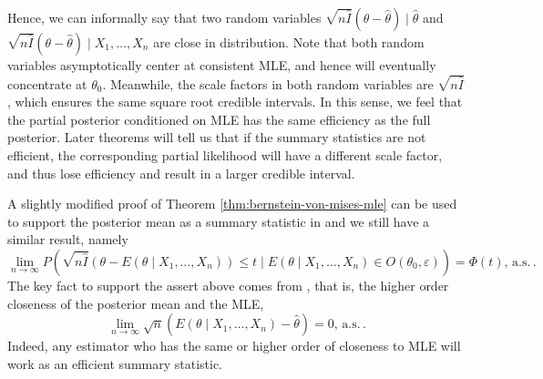 \documentclass[oneside,english]{amsbook}
\numberwithin{section}{chapter}
\numberwithin{equation}{section}
\numberwithin{figure}{section}
\theoremstyle{plain}
\theoremstyle{plain}
\theoremstyle{definition}
\theoremstyle{plain}
\theoremstyle{plain}
\theoremstyle{remark}
\theoremstyle{definition}
\theoremstyle{definition}
\newcommand{\ascv}{\,\mathrm{a.s.}\,}
\begin{document}
Hence, we can informally say that two random variables $\sqrt{n\hat{I}}\left(\theta-\hat{\theta}\right)\mid\hat{\theta}$
and $\sqrt{n\hat{I}}\left(\theta-\hat{\theta}\right)\mid X_{1},\ldots,X_{n}$
are close in distribution. Note that both random variables asymptotically
center at consistent MLE, and hence will eventually concentrate at
$\theta_{0}$. Meanwhile, the scale factors in both random variables
are $\sqrt{n\hat{I}}$, which {ensures
} the same square root credible  {intervals}.
In this sense, we feel that the partial posterior conditioned on MLE
has the same efficiency as the full posterior. Later theorems will
tell us that if the summary statistics are not efficient, the corresponding
partial likelihood will have a different scale factor, and thus lose
efficiency and result in a larger credible interval. 

A slightly modified proof of Theorem \ref{thm:bernstein-von-mises-mle}
can be used to support the posterior mean as a summary statistic in
\citet{fearnhead2012constructing} and we still have a similar result,
namely 
\[
\lim_{n\rightarrow\infty}P\left(\sqrt{n\hat{I}}\left(\theta-E\left(\theta\mid X_{1},\ldots,X_{n}\right)\right)\le t\mid E\left(\theta\mid X_{1},\ldots,X_{n}\right)\in O\left(\theta_{0},\varepsilon\right)\right)=\Phi\left(t\right),\ascv.
\]
The key fact to support the assert above comes from \citet{ghosh2011moment},
that is, the higher order closeness of the posterior mean and the
MLE, 
\begin{equation}
\lim_{n\rightarrow\infty}\sqrt{n}\left(E\left(\theta\mid X_{1},\ldots,X_{n}\right)-\hat{\theta}\right)=0,\ascv.\label{eq:high-order-close-post-mean-mle}
\end{equation}
Indeed, any estimator who has the same or higher order of closeness
to MLE will work as an efficient summary statistic.
\end{document}
